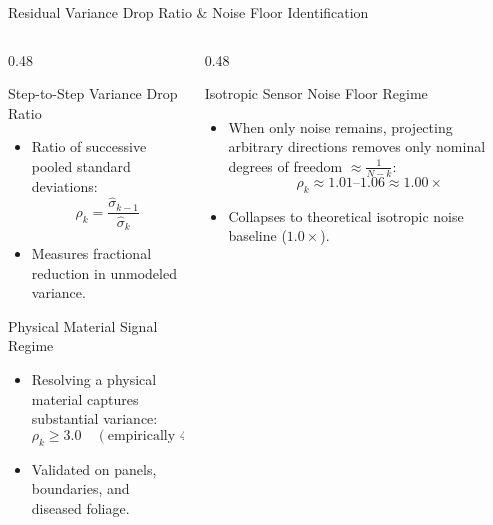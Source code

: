 \documentclass[aspectratio=169, 10pt]{beamer}
\begin{document}
\begin{frame}{Residual Variance Drop Ratio \& Noise Floor Identification}
  \begin{columns}[T]
    \begin{column}{0.48\textwidth}
      \begin{block}{Step-to-Step Variance Drop Ratio}
        \footnotesize
        \begin{itemize}\setlength{\itemsep}{2pt}
          \item Ratio of successive pooled standard deviations:
          $$\rho_k = \frac{\hat{\sigma}_{k-1}}{\hat{\sigma}_k}$$
          \item Measures fractional reduction in unmodeled variance.
        \end{itemize}
      \end{block}

      \begin{block}{Physical Material Signal Regime}
        \footnotesize
        \begin{itemize}\setlength{\itemsep}{2pt}
          \item Resolving a physical material captures substantial variance:
          $$\rho_k \ge 3.0 \quad (\text{empirically } 4.0\times\text{--}18.9\times)$$
          \item Validated on panels, boundaries, and diseased foliage.
        \end{itemize}
      \end{block}
    \end{column}

    \begin{column}{0.48\textwidth}
      \begin{block}{Isotropic Sensor Noise Floor Regime}
        \footnotesize
        \begin{itemize}\setlength{\itemsep}{2pt}
          \item When only noise remains, projecting arbitrary directions removes only nominal degrees of freedom $\approx \frac{1}{N-k}$:
          $$\rho_k \approx 1.01\text{--}1.06 \approx 1.00\times$$
          \item Collapses to theoretical isotropic noise baseline ($1.0\times$).
        \end{itemize}
      \end{block}


\end{column}
\end{columns}
\end{frame}
\end{document}
